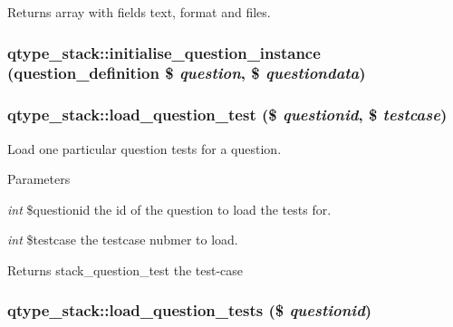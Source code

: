 \begin{DoxyReturn}{Returns}
array with fields text, format and files. 
\end{DoxyReturn}
\hypertarget{classqtype__stack_ab671a63ff15114501826a844ddd6eb21}{
\subsubsection[{initialise\_\-question\_\-instance}]{\setlength{\rightskip}{0pt plus 5cm}qtype\_\-stack::initialise\_\-question\_\-instance (question\_\-definition \$ {\em question}, \/  \$ {\em questiondata})}}
\label{classqtype__stack_ab671a63ff15114501826a844ddd6eb21}
\hypertarget{classqtype__stack_a3a3be570d5a183d63559b0e614166a39}{
\subsubsection[{load\_\-question\_\-test}]{\setlength{\rightskip}{0pt plus 5cm}qtype\_\-stack::load\_\-question\_\-test (\$ {\em questionid}, \/  \$ {\em testcase})}}
\label{classqtype__stack_a3a3be570d5a183d63559b0e614166a39}
Load one particular question tests for a question. 
\begin{DoxyParams}{Parameters}
\item[{\em int}]\$questionid the id of the question to load the tests for. \item[{\em int}]\$testcase the testcase nubmer to load. \end{DoxyParams}
\begin{DoxyReturn}{Returns}
stack\_\-question\_\-test the test-\/case 
\end{DoxyReturn}
\hypertarget{classqtype__stack_ab8695824b17f6c4f34c79027cfcfb1bf}{
\subsubsection[{load\_\-question\_\-tests}]{\setlength{\rightskip}{0pt plus 5cm}qtype\_\-stack::load\_\-question\_\-tests (\$ {\em questionid})}}
